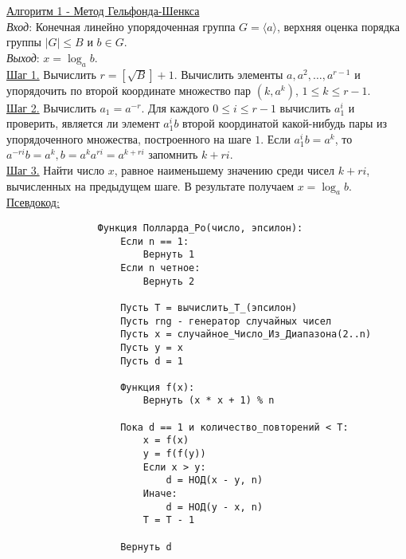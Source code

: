 \documentclass[bachelor, och, labwork]{shiza}
\begin{document}
        \underline{Алгоритм 1 - Метод Гельфонда-Шенкса}\\
            \textit{Вход}: Конечная линейно упорядоченная группа $G = \langle a
            \rangle$, верхняя оценка порядка группы $|G| \leq B$ и $b \in G$.\\
            \textit{Выход}: $x = \log_a b$.\\
            \underline{Шаг 1.} Вычислить $r = [\sqrt{B}] + 1$. Вычислить
            элементы $a, a^2, \dots, a^{r-1}$ и упорядочить по второй координате
            множество пар $(k, a^k)$, $1 \leq k \leq r - 1$.\\
            \underline{Шаг 2.} Вычислить $a_1 = a^{-r}$. Для каждого $0 \leq i
            \leq r - 1$ вычислить $a_1^i$ и проверить, является ли элемент
            $a_1^i b$ второй координатой какой-нибудь пары из упорядоченного
            множества, построенного на шаге $1$. Если $a_1^i b = a^k$, то
            $a^{-ri} b = a^k, b = a^k a^{ri} = a^{k + ri}$ запомнить $k + ri$.\\
            \underline{Шаг 3.} Найти число $x$, равное наименьшему значению
            среди чисел $k + ri$, вычисленных на предыдущем шаге. В результате
            получаем $x = \log_a b$.\\
            
        \underline{Псевдокод:}
            \begin{verbatim}
                Функция Полларда_Ро(число, эпсилон):
                    Если n == 1:
                        Вернуть 1
                    Если n четное:
                        Вернуть 2
                    
                    Пусть T = вычислить_T_(эпсилон)
                    Пусть rng - генератор случайных чисел
                    Пусть x = случайное_Число_Из_Диапазона(2..n)
                    Пусть y = x
                    Пусть d = 1
                    
                    Функция f(x):
                        Вернуть (x * x + 1) % n
                    
                    Пока d == 1 и количество_повторений < T:
                        x = f(x)
                        y = f(f(y))
                        Если x > y:
                            d = НОД(x - y, n)
                        Иначе:
                            d = НОД(y - x, n)
                        T = T - 1
                    
                    Вернуть d       
            \end{verbatim}
\end{document}
